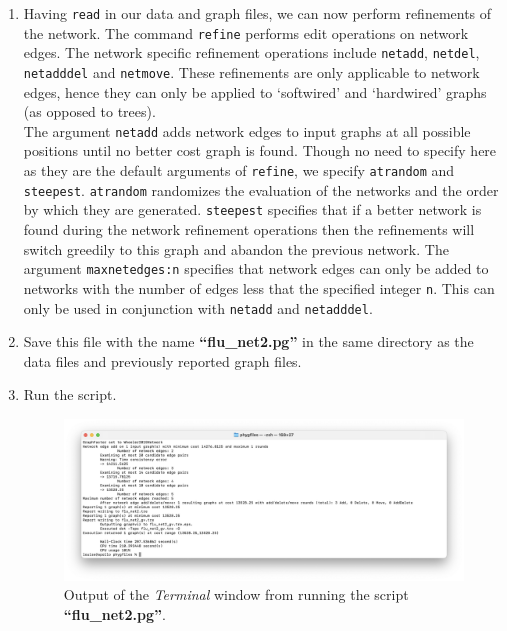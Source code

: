 \documentclass[11pt]{article}
\begin{document}
\begin {enumerate}
\item Having \texttt{read} in our data and graph files, we can now perform refinements 
of the network. The command \texttt{refine} performs edit operations on network 
edges. The network specific refinement operations include \texttt{netadd}, 
\texttt{netdel}, \texttt{netadddel} and \texttt{netmove}. These refinements are 
only applicable to network edges, hence they can only be applied to `softwired' 
and `hardwired' graphs (as opposed to trees). \\

The argument \texttt{netadd} adds network edges to input graphs at all possible
positions until no better cost graph is found. Though no need to specify here as
they are the default arguments of \texttt{refine}, we specify \texttt{atrandom} and 
\texttt{steepest}. \texttt{atrandom} randomizes the evaluation of the networks and 
the order by which they are generated. \texttt{steepest} specifies that if a better 
network is found during the network refinement operations then the refinements 
will switch greedily to this graph and abandon the previous network. The argument  
\texttt{maxnetedges:n} specifies that network edges can only be added to networks 
with the number of edges less that the specified integer \texttt{n}. This can only be 
used in conjunction with \texttt{netadd} and \texttt{netadddel}.

\item Save this file with the name \textbf{``flu\_net2.pg''} in the same directory as the 
data files and previously reported graph files.

\item Run the script.

\begin{figure}[H]
\centering
\includegraphics[width=\textwidth]{output1.png}
\caption{Output of the \textit{Terminal} window from running the script 
\textbf{``flu\_net2.pg''}.}
\label{output1}
\end{figure}


\end{enumerate}
\end{document}
